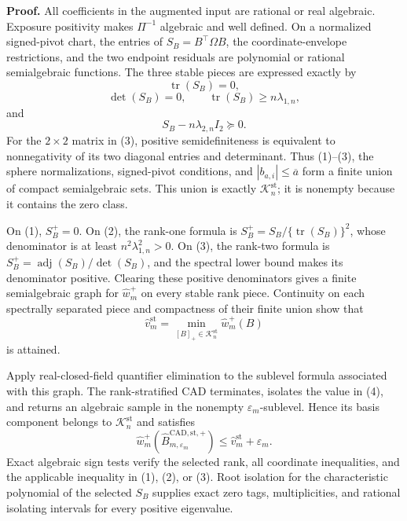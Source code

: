 \textbf{Proof.}
All coefficients in the augmented input are rational or real algebraic.  Exposure positivity makes \(\Pi^{-1}\) algebraic and well defined.  On a normalized signed-pivot chart, the entries of \(S_B=B^{\top}\Omega B\), the coordinate-envelope restrictions, and the two endpoint residuals are polynomial or rational semialgebraic functions.  The three stable pieces are expressed exactly by
\[
\operatorname{tr}(S_B)=0,
\tag{1}
\]
\[
\det(S_B)=0,\qquad \operatorname{tr}(S_B)\ge n\lambda_{1,n},
\tag{2}
\]
and
\[
S_B-n\lambda_{2,n}I_2\succeq0.
\tag{3}
\]
For the \(2\times2\) matrix in (3), positive semidefiniteness is equivalent to nonnegativity of its two diagonal entries and determinant.  Thus (1)--(3), the sphere normalizations, signed-pivot conditions, and \(|b_{a,i}|\le\overline a\) form a finite union of compact semialgebraic sets.  This union is exactly \(\mathcal K_n^{\mathrm{st}}\); it is nonempty because it contains the zero class.

On (1), \(S_B^+=0\).  On (2), the rank-one formula is \(S_B^+=S_B/\{\operatorname{tr}(S_B)\}^2\), whose denominator is at least \(n^2\lambda_{1,n}^2>0\).  On (3), the rank-two formula is \(S_B^+=\operatorname{adj}(S_B)/\det(S_B)\), and the spectral lower bound makes its denominator positive.  Clearing these positive denominators gives a finite semialgebraic graph for \(\widehat w_m^+\) on every stable rank piece.  Continuity on each spectrally separated piece and compactness of their finite union show that
\[
\widehat v_m^{\mathrm{st}}
=\min_{[B]_+\in\mathcal K_n^{\mathrm{st}}}\widehat w_m^+(B)
\tag{4}
\]
is attained.

Apply real-closed-field quantifier elimination to the sublevel formula associated with this graph.  The rank-stratified CAD terminates, isolates the value in (4), and returns an algebraic sample in the nonempty \(\varepsilon_m\)-sublevel.  Hence its basis component belongs to \(\mathcal K_n^{\mathrm{st}}\) and satisfies
\[
\widehat w_m^+(\widehat B_{m,\varepsilon_m}^{\mathrm{CAD,st},+})
\le\widehat v_m^{\mathrm{st}}+\varepsilon_m.
\tag{5}
\]
Exact algebraic sign tests verify the selected rank, all coordinate inequalities, and the applicable inequality in (1), (2), or (3).  Root isolation for the characteristic polynomial of the selected \(S_B\) supplies exact zero tags, multiplicities, and rational isolating intervals for every positive eigenvalue.

